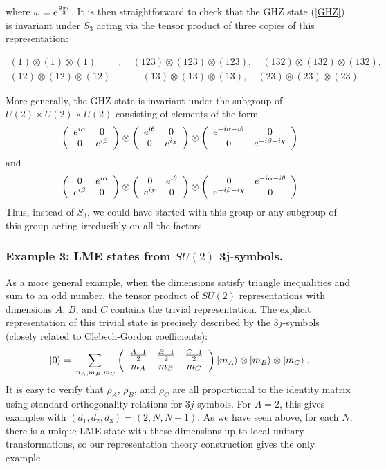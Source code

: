 \documentclass[12pt]{article}
\theoremstyle{definition}
\newcommand{\be}{\begin{equation}}
\newcommand{\ee}{\end{equation}}
\newcommand{\ba}{\begin{array}}
\newcommand{\ea}{\end{array}}
\begin{document}
where $\omega = e^{2 \pi i \over 3}$. It is
then straightforward to check that the GHZ state (\ref{GHZ}) is
invariant under $S_3$ acting via the tensor product of three copies of
this representation:

\begin{align*}
(1) \otimes (1) \otimes (1)&,\quad  (123) \otimes (123) \otimes
(123),\quad  (132)  \otimes (132) 
 \otimes (132) ,\quad \\
 (12) \otimes
(12) \otimes (12)&,\quad \quad  (13) \otimes (13) \otimes
(13),\quad (23) \otimes (23) \otimes (23).
\end{align*}


More generally, the GHZ state is invariant under the subgroup of $U(2)
\times U(2) \times U(2)$ consisting of elements of the form \be \left(
\ba{cc} e^{i \alpha} & 0 \cr 0 & e^{i \beta} \ea \right) \otimes
\left( \ba{cc} e^{i \theta} & 0 \cr 0 & e^{i \chi} \ea \right) \otimes
\left( \ba{cc} e^{-i \alpha - i \theta} & 0 \cr 0 & e^{-i \beta - i
\chi} \ea \right) \ee and \be \left( \ba{cc} 0 & e^{i \alpha} \cr e^{i
\beta} & 0 \ea \right) \otimes \left( \ba{cc} 0 & e^{i \theta} \cr
e^{i \chi} & 0 \ea \right) \otimes \left( \ba{cc} 0 & e^{-i \alpha - i
\theta} \cr e^{-i \beta - i \chi} & 0 \ea \right) \ee Thus, instead of
$S_3$, we could have started with this group or any subgroup of this
group acting irreducibly on all the factors.

\subsubsection*{Example 3: LME states from $SU(2)$ 3j-symbols.}

As a more general example, when the dimensions satisfy triangle inequalities and sum to an odd number, the tensor product of $SU(2)$ representations with dimensions $A$, $B$, and $C$ contains the trivial representation. The explicit representation of this trivial state is precisely described by the $3j$-symbols (closely related to Clebsch-Gordon coefficients):
\be
|0 \rangle =  \sum_{m_A,m_B,m_C} \left( \ba{ccc} {A - 1 \over 2} & {B - 1 \over 2} &{C - 1 \over 2} \cr m_A & m_B & m_C \ea \right) |m_A \rangle \otimes |m_B \rangle \otimes |m_C \rangle \; .
\ee
It is easy to verify that $\rho_A$, $\rho_B$, and $\rho_C$ are all proportional to the identity matrix using standard orthogonality relations for $3j$ symbols. For $A=2$, this gives examples with $(d_1,d_2,d_3) = (2,N,N+1)$. As we have seen above, for each $N$, there is a unique LME state with these dimensions up to local unitary transformations, so our representation theory construction gives the only example.
\end{document}
